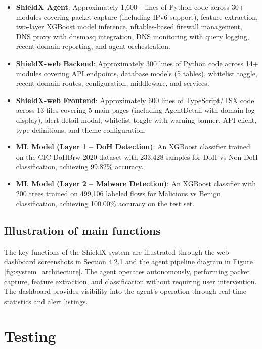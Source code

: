 \documentclass[../Main.tex]{subfiles}
\begin{document}
\begin{itemize}
    \item \textbf{ShieldX Agent}: Approximately 1,600+ lines of Python code across 30+ modules covering packet capture (including IPv6 support), feature extraction, two-layer XGBoost model inference, nftables-based firewall management, DNS proxy with dnsmasq integration, DNS monitoring with query logging, recent domain reporting, and agent orchestration.
    \item \textbf{ShieldX-web Backend}: Approximately 300 lines of Python code across 14+ modules covering API endpoints, database models (5 tables), whitelist toggle, recent domain routes, configuration, middleware, and services.
    \item \textbf{ShieldX-web Frontend}: Approximately 600 lines of TypeScript/TSX code across 13 files covering 5 main pages (including AgentDetail with domain log display), alert detail modal, whitelist toggle with warning banner, API client, type definitions, and theme configuration.
    \item \textbf{ML Model (Layer 1 -- DoH Detection)}: An XGBoost classifier trained on the CIC-DoHBrw-2020 dataset with 233,428 samples for DoH vs Non-DoH classification, achieving 99.82\% accuracy.
    \item \textbf{ML Model (Layer 2 -- Malware Detection)}: An XGBoost classifier with 200 trees trained on 499,106 labeled flows for Malicious vs Benign classification, achieving 100.00\% accuracy on the test set.
\end{itemize}

\subsection{Illustration of main functions}
\label{section:4.3.3}

The key functions of the ShieldX system are illustrated through the web dashboard screenshots in Section 4.2.1 and the agent pipeline diagram in Figure \ref{fig:system_architecture}. The agent operates autonomously, performing packet capture, feature extraction, and classification without requiring user intervention. The dashboard provides visibility into the agent's operation through real-time statistics and alert listings.

\section{Testing}
\label{section:4.4}
\end{document}
